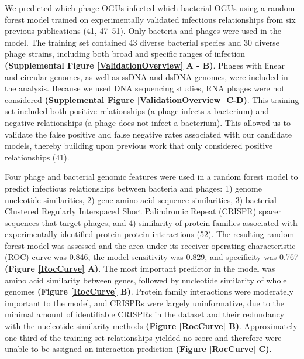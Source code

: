 \documentclass[12pt,]{article}
\begin{document}
We predicted which phage OGUs infected which bacterial OGUs using a
random forest model trained on experimentally validated infectious
relationships from six previous publications (41, 47--51). Only bacteria
and phages were used in the model. The training set contained 43 diverse
bacterial species and 30 diverse phage strains, including both broad and
specific ranges of infection \textbf{(Supplemental Figure
\ref{ValidationOverview} A - B)}. Phages with linear and circular
genomes, as well as ssDNA and dsDNA genomes, were included in the
analysis. Because we used DNA sequencing studies, RNA phages were not
considered \textbf{(Supplemental Figure \ref{ValidationOverview} C-D)}.
This training set included both positive relationships (a phage infects
a bacterium) and negative relationships (a phage does not infect a
bacterium). This allowed us to validate the false positive and false
negative rates associated with our candidate models, thereby building
upon previous work that only considered positive relationships (41).

Four phage and bacterial genomic features were used in a random forest
model to predict infectious relationships between bacteria and phages:
1) genome nucleotide similarities, 2) gene amino acid sequence
similarities, 3) bacterial Clustered Regularly Interspaced Short
Palindromic Repeat (CRISPR) spacer sequences that target phages, and 4)
similarity of protein families associated with experimentally identified
protein-protein interactions (52). The resulting random forest model was
assessed and the area under its receiver operating characteristic (ROC)
curve was 0.846, the model sensitivity was 0.829, and specificity was
0.767 \textbf{(Figure \ref{RocCurve} A)}. The most important predictor
in the model was amino acid similarity between genes, followed by
nucleotide similarity of whole genomes \textbf{(Figure \ref{RocCurve}
B)}. Protein family interactions were moderately important to the model,
and CRISPRs were largely uninformative, due to the minimal amount of
identifiable CRISPRs in the dataset and their redundancy with the
nucleotide similarity methods \textbf{(Figure \ref{RocCurve} B)}.
Approximately one third of the training set relationships yielded no
score and therefore were unable to be assigned an interaction prediction
\textbf{(Figure \ref{RocCurve} C)}.
\end{document}
